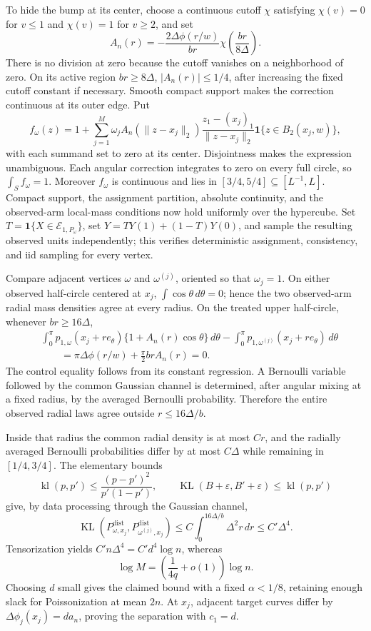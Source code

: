 To hide the bump at its center, choose a continuous cutoff \(\chi\) satisfying
\(\chi(v)=0\) for \(v\leq1\) and \(\chi(v)=1\) for \(v\geq2\), and set
\[
 A_n(r)=-\frac{2\Delta\phi(r/w)}{br}
 \chi\!\left(\frac{br}{8\Delta}\right).
\]
There is no division at zero because the cutoff vanishes on a neighborhood of
zero.  On its active region \(br\geq8\Delta\),
\(|A_n(r)|\leq1/4\), after increasing the fixed cutoff constant if necessary.
Smooth compact support makes the correction continuous at its outer edge.  Put
\[
 f_\omega(z)=1+\sum_{j=1}^M\omega_j
 A_n(\lVert z-x_j\rVert_2)
 \frac{z_1-(x_j)_1}{\lVert z-x_j\rVert_2}
 \mathbf1\{z\in B_2(x_j,w)\},
\]
with each summand set to zero at its center.  Disjointness makes the expression
unambiguous.  Each angular correction integrates to zero on every full circle,
so \(\int_Sf_\omega=1\).  Moreover \(f_\omega\) is continuous and lies in
\([3/4,5/4]\subseteq[L^{-1},L]\).  Compact support, the assignment partition,
absolute continuity, and the observed-arm local-mass conditions now hold
uniformly over the hypercube.  Set
\(T=\mathbf1\{X\in\mathcal E_{1,P_\omega}\}\), set
\(Y=TY(1)+(1-T)Y(0)\), and sample the resulting observed units independently;
this verifies deterministic assignment, consistency, and iid sampling for every
vertex.

Compare adjacent vertices \(\omega\) and \(\omega^{(j)}\), oriented so that
\(\omega_j=1\).  On either observed half-circle centered at \(x_j\),
\(\int\cos\theta\,d\theta=0\); hence the two observed-arm radial mass
densities agree at every radius.  On the treated upper half-circle, whenever
\(br\geq16\Delta\),
\[
\begin{aligned}
 &\int_0^\pi p_{1,\omega}(x_j+re_\theta)
 \{1+A_n(r)\cos\theta\}\,d\theta
 -\int_0^\pi p_{1,\omega^{(j)}}(x_j+re_\theta)\,d\theta\\
 &\qquad=\pi\Delta\phi(r/w)+\frac\pi2brA_n(r)=0.
\end{aligned}
\]
The control equality follows from its constant regression.  A Bernoulli
variable followed by the common Gaussian channel is determined, after angular
mixing at a fixed radius, by the averaged Bernoulli probability.  Therefore the
entire observed radial laws agree outside \(r\leq16\Delta/b\).

Inside that radius the common radial density is at most \(Cr\), and the
radially averaged Bernoulli probabilities differ by at most \(C\Delta\) while
remaining in \([1/4,3/4]\).  The elementary bounds
\[
 \operatorname{kl}(p,p')\leq
 \frac{(p-p')^2}{p'(1-p')},
 \qquad
 \operatorname{KL}(B+\varepsilon,B'+\varepsilon)
 \leq\operatorname{kl}(p,p')
\]
give, by data processing through the Gaussian channel,
\[
 \operatorname{KL}(P^{\mathrm{dist}}_{\omega,x_j},
 P^{\mathrm{dist}}_{\omega^{(j)},x_j})
 \leq C\int_0^{16\Delta/b}\Delta^2r\,dr
 \leq C'\Delta^4.
\]
Tensorization yields \(C'n\Delta^4=C'd^4\log n\), whereas
\[
 \log M=\left(\frac1{4q}+o(1)\right)\log n.
\]
Choosing \(d\) small gives the claimed bound with a fixed
\(\alpha<1/8\), retaining enough slack for Poissonization at mean \(2n\).
At \(x_j\), adjacent target curves differ by
\(\Delta\phi_j(x_j)=da_n\), proving the separation with \(c_1=d\).

